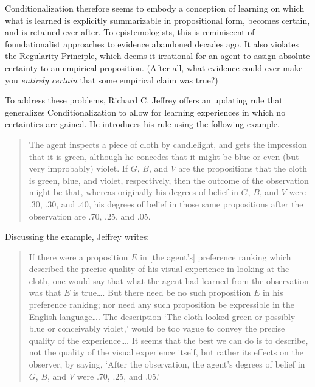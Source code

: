 Conditionalization therefore seems to embody a conception of learning on which what is learned is explicitly summarizable in propositional form, becomes certain, and is retained ever after. To epistemologists, this is reminiscent of foundationalist approaches to evidence abandoned decades ago. It also violates the Regularity Principle, which deems it irrational for an agent to assign absolute certainty to an empirical proposition. (After all, what evidence could ever make you \emph{entirely certain} that some empirical claim was true?) 

To address these problems, Richard C. Jeffrey offers an updating rule that generalizes Conditionalization to allow for learning experiences in which no certainties are gained. He introduces his rule using the following example.
\begin{quote}
The agent inspects a piece of cloth by candlelight, and gets the impression that it is green, although he concedes that it might be blue or even (but very improbably) violet. If $G$, $B$, and $V$ are the propositions that the cloth is green, blue, and violet, respectively, then the outcome of the observation might be that, whereas originally his degrees of belief in $G$, $B$, and $V$ were $.30$, $.30$, and $.40$, his degrees of belief in those same propositions after the observation are $.70$, $.25$, and $.05$. \citep[p.\ 154]{JeffreyLogic}
\end{quote}
Discussing the example, Jeffrey writes:
\begin{quote}
If there were a proposition $E$ in [the agent's] preference ranking which described the precise quality of his visual experience in looking at the cloth, one would say that what the agent had learned from the observation was that $E$ is true\ldots. But there need be no such proposition $E$ in his preference ranking; nor need any such proposition be expressible in the English language\ldots. The description `The cloth looked green or possibly blue or conceivably violet,' would be too vague to convey the precise quality of the experience\ldots. It seems that the best we can do is to describe, not the quality of the visual experience itself, but rather its effects on the observer, by saying, `After the observation, the agent's degrees of belief in $G$, $B$, and $V$ were $.70$, $.25$, and $.05$.' \citep[pp.~154--5]{JeffreyLogic}
\end{quote}

